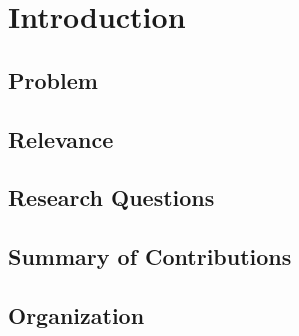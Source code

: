 \chapter{Introduction}

\section{Problem}
\section{Relevance}
\section{Research Questions}
\section{Summary of Contributions}
\section{Organization}